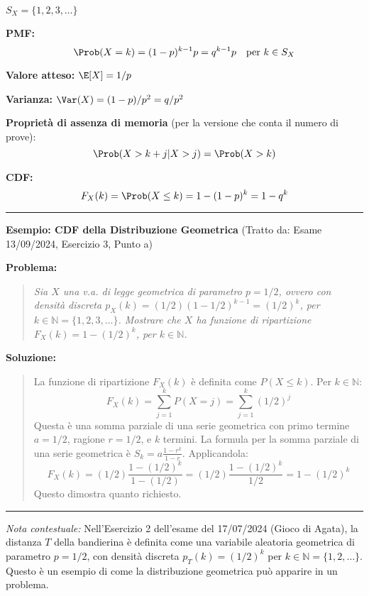 $S_X = \{1, 2, 3, \dots\}$

\textbf{PMF:} 
\[ \Prob(X=k) = (1-p)^{k-1} p = q^{k-1}p \quad \text{per } k \in S_X \]

\textbf{Valore atteso:} $\E[X] = 1/p$

\textbf{Varianza:} $\Var(X) = (1-p)/p^2 = q/p^2$

\textbf{Proprietà di assenza di memoria} (per la versione che conta il numero di prove):
\[ \Prob(X > k+j | X > j) = \Prob(X > k) \]

\textbf{CDF:} 
\[ F_X(k) = \Prob(X \le k) = 1 - (1-p)^k = 1 - q^k \]

\vspace{1em}
\hrule
\par\vspace{0.5em}
\noindent\textbf{Esempio: CDF della Distribuzione Geometrica} (Tratto da: Esame 13/09/2024, Esercizio 3, Punto a)
\par\vspace{0.5em}
\noindent\textbf{Problema:}
\begin{quote}
\itshape
Sia $X$ una v.a. di legge geometrica di parametro $p=1/2$, ovvero con densità discreta $p_X(k) = (1/2)(1-1/2)^{k-1} = (1/2)^k$, per $k \in \mathbb{N} = \{1,2,3,\dots\}$.
Mostrare che $X$ ha funzione di ripartizione $F_X(k) = 1 - (1/2)^k$, per $k \in \mathbb{N}$.
\end{quote}
\noindent\textbf{Soluzione:}
\begin{quote}
La funzione di ripartizione $F_X(k)$ è definita come $P(X \le k)$. Per $k \in \mathbb{N}$:
\[ F_X(k) = \sum_{j=1}^{k} P(X=j) = \sum_{j=1}^{k} (1/2)^j \]
Questa è una somma parziale di una serie geometrica con primo termine $a = 1/2$, ragione $r = 1/2$, e $k$ termini.
La formula per la somma parziale di una serie geometrica è $S_k = a \frac{1-r^k}{1-r}$.
Applicandola:
\[ F_X(k) = (1/2) \frac{1-(1/2)^k}{1-(1/2)} = (1/2) \frac{1-(1/2)^k}{1/2} = 1-(1/2)^k \]
Questo dimostra quanto richiesto.
\end{quote}
\vspace{0.5em}
\hrule
\vspace{1em}

\noindent \textit{Nota contestuale:} Nell'Esercizio 2 dell'esame del 17/07/2024 (Gioco di Agata), la distanza $T$ della bandierina è definita come una variabile aleatoria geometrica di parametro $p=1/2$, con densità discreta $p_T(k) = (1/2)^k$ per $k \in \mathbb{N} = \{1, 2, \dots\}$. Questo è un esempio di come la distribuzione geometrica può apparire in un problema.


